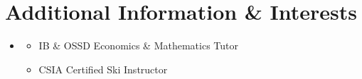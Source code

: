 \documentclass[letterpaper,10pt]{article}
\newcommand{\resumeItem}[1]{
  \item\small{
    {#1 \vspace{-2pt}}
  }
}
\newcommand{\resumeSubHeadingListStart}{\begin{itemize}[leftmargin=0.0in, label={}]}
\newcommand{\resumeSubHeadingListEnd}{\end{itemize}}
\newcommand{\resumeItemListStart}{\begin{itemize}[label=--]}
\newcommand{\resumeItemListEnd}{\end{itemize}\vspace{-5pt}}
\begin{document}
\section{Additional Information \& Interests}
    \resumeSubHeadingListStart
      \resumeItem{}
        \resumeItemListStart
            \resumeItem{IB \& OSSD Economics \& Mathematics Tutor}
            \resumeItem{CSIA Certified Ski Instructor}
        \resumeItemListEnd
    \resumeSubHeadingListEnd
\end{document}
